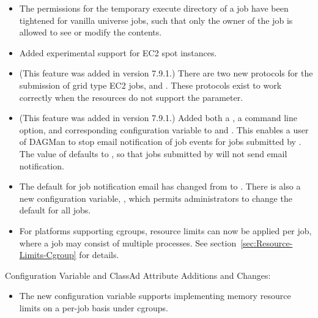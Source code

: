 \begin{itemize}

\item The permissions for the temporary execute directory of a job
have been tightened for vanilla universe jobs, 
such that only the owner of the job is allowed to see or
modify the contents.

\item Added experimental support for EC2 spot instances.

\item (This feature was added in version 7.9.1.)  
There are two new protocols for the submission of grid type EC2 jobs,
 and .
These protocols exist to work correctly when the resources do not support 
the  parameter.

\item (This feature was added in version 7.9.1.)  
Added both a ,
a  command line option,
and corresponding
 configuration variable
to  and .
This enables a user of DAGMan to stop email notification of job
events for jobs submitted by . The value of
 defaults to ,
so that jobs submitted
by  will not send email notification. 

\item The default for job notification email has changed
from  to . 
There is also a new configuration variable, ,
which permits administrators to change the default for all jobs.

\item For platforms supporting cgroups,
resource limits can now be applied per job,
where a job may consist of multiple processes.
See section~\ref{sec:Resource-Limits-Cgroup} for details.

\end{itemize}

\noindent Configuration Variable and ClassAd Attribute Additions and Changes:

\begin{itemize}

\item The new configuration variable 
supports implementing memory resource limits on a per-job basis under cgroups.

\end{itemize}

